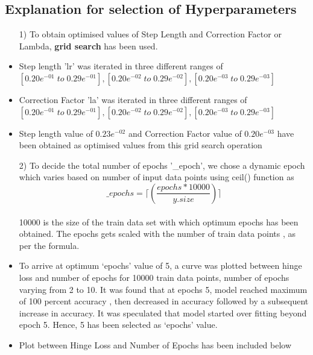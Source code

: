 \documentclass{article}
\begin{document}
\subsection{Explanation for selection of Hyperparameters}

\begin{itemize}
\item[1)] To obtain optimised values of Step Length and Correction Factor or Lambda, \textbf{grid search} has been used.
\item Step length 'lr' was iterated in three different ranges of $[0.20e^{-01} \; to \; 0.29e^{-01}],[0.20e^{-02}\;  to \; 0.29e^{-02}],[0.20e^{-03} \; to \; 0.29e^{-03}]$
\item Correction Factor 'la' was iterated in three different ranges of $[0.20e^{-01} \; to \; 0.29e^{-01}],[0.20e^{-02}\;  to \; 0.29e^{-02}],[0.20e^{-03} \; to \; 0.29e^{-03}]$
\item Step length value of $0.23e^{-02}$ and Correction Factor value of $0.20e^{-03}$ have been obtained as optimised values from this grid search operation
\item[2)] To decide the total number of epochs '\_epoch', we chose a dynamic epoch which varies based on number of input data points using ceil() function as 
\[\_epochs = \lceil(\frac{epochs*10000}{y.size})\rceil\]
\\10000 is the size of the train data set with which optimum epochs has been obtained. The epochs gets scaled with the number of train data points , as per the formula.
\item To arrive at optimum ‘epochs’ value of 5, a curve was plotted between hinge loss and number of epochs for 10000 train data points, number of epochs varying from 2 to 10. It was found that at epochs 5, model reached maximum of 100 percent accuracy , then decreased in accuracy followed by a subsequent increase in accuracy. It was speculated that model started over fitting beyond epoch 5. Hence,  5 has been selected as ‘epochs’ value.
\item Plot between Hinge Loss and Number of Epochs has been included below\\
\\

\end{itemize}
\end{document}
